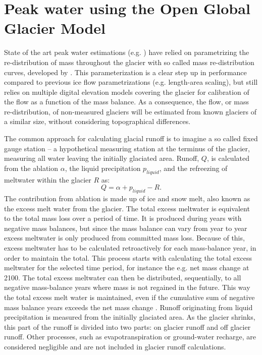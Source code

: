\documentclass[12pt, a4paper]{article}
\begin{document}
\section{Peak water using the Open Global Glacier Model}
State of the art peak water estimations (e.g.
\cite{rounceGlacierMassChange2020,hussGlobalscaleHydrologicalResponse2018}) have
relied on parametrizing the re-distribution of mass throughout the glacier with
so called mass re-distribution curves, developed by
\textcite{hussFutureHighmountainHydrology2010}. This parameterization is a clear
step up in performance compared to previous ice flow parametrizations (e.g.
length-area scaling), but still relies on multiple digital elevation models
covering the glacier for calibration of the flow as a function of the mass
balance. As a consequence, the flow, or mass re-distribution, of non-measured
glaciers will be estimated from known glaciers of a similar size, without
considering topographical differences. 

The common approach for calculating glacial runoff is to imagine a so called
fixed gauge station -- a hypothetical measuring station at the terminus of the
glacier, measuring all water leaving the initially glaciated area. Runoff, $Q$,
is calculated from the ablation $\alpha$, the liquid precipitation $p_{liquid}$,
and the refreezing of meltwater within the glacier $R$ as:
\begin{equation}
    Q = \alpha + p_{liquid} - R.
\end{equation}
The contribution from ablation is made up of ice and snow melt, also known as
the excess melt water from the glacier. The total excess meltwater is equivalent
to the total mass loss over a period of time. It is produced during years with
negative mass balances, but since the mass balance can vary from year to year
excess meltwater is only produced from committed mass loss. Because of this,
excess meltwater has to be calculated retroactively for each mass-balance year,
in order to maintain the total. This process starts with calculating the total
excess meltwater for the selected time period, for instance the e.g. net mass
change at 2100. The total excess meltwater can then be distributed,
sequentially, to all negative mass-balance years where mass is not regained in
the future. This way the total excess melt water is maintained, even if the
cumulative sum of negative mass balance years exceeds the net mass change
\parencite{rounceGlacierMassChange2020}. Runoff originating from liquid
precipitation is measured from the initially glaciated area. As the glacier
shrinks, this part of the runoff is divided into two parts: on glacier
runoff and off glacier runoff. Other processes, such as evapotranspiration or
ground-water recharge, are considered negligible and are not
included in glacier runoff calculations.
\end{document}
